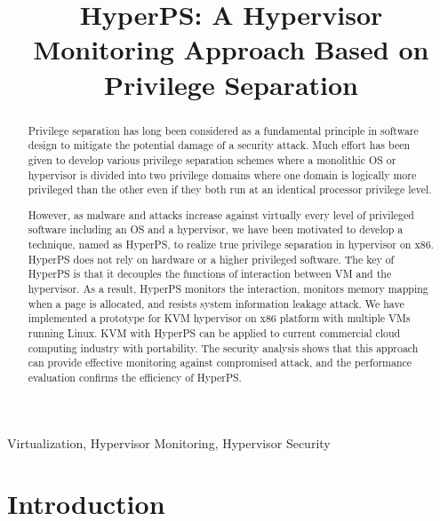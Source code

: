 \documentclass[conference]{IEEEtran}
\begin{document}
\title{HyperPS: A Hypervisor Monitoring Approach Based on Privilege Separation}

\maketitle

\begin{abstract}

Privilege separation has long been considered as a fundamental principle in software design to mitigate the potential damage of a security attack. Much effort has been given to develop various privilege separation schemes where a monolithic OS or hypervisor is divided into two privilege domains where one domain is logically more privileged than the other even if they both run at an identical processor privilege level.

However, as malware and attacks increase against virtually every level of privileged software including
an OS and a hypervisor, we have been motivated to develop a technique, named as HyperPS, to realize true privilege separation in hypervisor on x86. HyperPS does not rely on hardware or a higher privileged software. 
The key of HyperPS is that it decouples the functions of interaction between VM and the hypervisor. As a result, HyperPS monitors the interaction, monitors memory mapping when a page is allocated, and resists system information leakage attack.
We have implemented a prototype for KVM hypervisor on x86 platform with multiple VMs running Linux. KVM with HyperPS can be applied to current commercial cloud computing industry with portability. The security analysis shows that this approach can provide effective monitoring against compromised attack, and the performance evaluation confirms the efficiency of HyperPS.
\end{abstract}

\begin{IEEEkeywords}
Virtualization, Hypervisor Monitoring, Hypervisor Security
\end{IEEEkeywords}

\section{Introduction}
\end{document}
